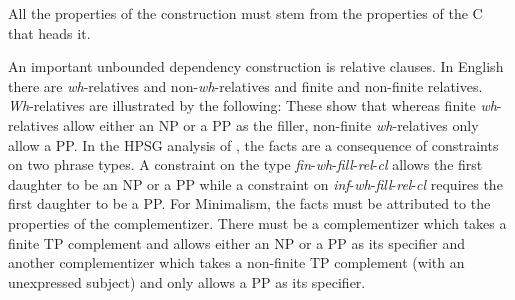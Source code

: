\documentclass[output=paper]{langsci/langscibook}
\begin{document}
All the properties of the construction must stem from the properties of the C that heads it. 

An important unbounded dependency construction is relative clauses. In English there are \textit{wh}-relatives and non-\textit{wh}-relatives and finite and non-finite relatives. \textit{Wh}-relatives are illustrated by the following:
\eal
{}\label{ex:min-someone-who-can}
\label{ex:min-someone-on-whom-can}
\zl 
\eal
{}\label{ex:min-someone-who-to}
\label{ex:min-someone-whom-to}
\zl 
These show that whereas finite \textit{wh}-relatives allow either an NP or a PP as the filler, non-finite \textit{wh}-relatives only allow a PP. In the HPSG analysis of \citet{Sag97a}, the facts are a consequence of constraints on two phrase types. A constraint on the type \textit{fin}-\textit{wh}-\textit{fill}-\textit{rel}-\textit{cl} allows the first daughter to be an NP or a PP while a constraint on \textit{inf}-\textit{wh}-\textit{fill}-\textit{rel}-\textit{cl} requires the first daughter to be a PP. For Minimalism, the facts must be attributed to the properties of the complementizer. There must be a complementizer which takes a finite TP complement and allows either an NP or a PP as its specifier and another complementizer which takes a non-finite TP complement (with an unexpressed subject) and only allows a PP as its specifier.
\end{document}
